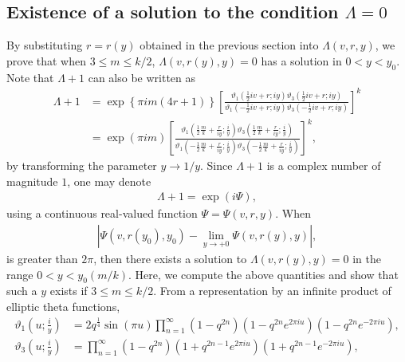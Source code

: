 \documentclass[10pt,leqno]{amsart}
\numberwithin{equation}{section}
\begin{document}
\subsection{Existence of a solution to the condition
\texorpdfstring{$\Lambda=0$}{of Lambda}
}\label{subsection:Existence of a solution to closure condition}
By substituting $r=r(y)$ obtained in the previous section into $\Lambda(v, r, y)$, we prove that when $3\leq m\leq k/2$, $\Lambda(v, r(y), y)=0$ has a solution in $0<y<y_0$.
Note that $\Lambda + 1$ can also be written as 
\begin{equation}\label{Lambdarewrite}
\begin{split}
\Lambda+1&=\exp\left\{\pi im\left(4r+1\right)\right\}\left[\frac{\vartheta_1\left(\frac{1}{2}iv+r;iy\right)\vartheta_3\left(\frac{1}{2}iv+r;iy\right)}{\vartheta_1\left(-\frac{1}{2}iv+r;iy\right)\vartheta_3\left(-\frac{1}{2}iv+r;iy\right)}\right]^k\\
&=\exp{\left(\pi i m\right)}\left[\frac{\vartheta_1\left(\frac{1}{2}\frac{m}{k}+\frac{r}{iy};\frac{i}{y}\right)\vartheta_3\left(\frac{1}{2}\frac{m}{k}+\frac{r}{iy};\frac{i}{y}\right)}{\vartheta_1\left(-\frac{1}{2}\frac{m}{k}+\frac{r}{iy};\frac{i}{y}\right)\vartheta_3\left(-\frac{1}{2}\frac{m}{k}+\frac{r}{iy};\frac{i}{y}\right)}\right]^k,
 \end{split}
\end{equation}
by transforming the parameter $y\rightarrow1/y$.
Since $\Lambda+1$ is a complex number of magnitude $1$, one may denote
\begin{align}
    \Lambda+1=\exp{\left(i\Psi\right)},
\end{align}
using a continuous real-valued function $\Psi=\Psi(v, r, y)$.
When
\begin{align}
    \left |\Psi(v, r(y_0), y_0)-\lim_{y\to +0}\Psi(v, r(y), y)\right |,
\end{align}
is greater than $2\pi$, then there exists a solution to $\Lambda(v, r(y), y)=0$ in the range $0<y< y_0(m/k)$.
Here, we compute the above quantities and show that such a $y$ exists if $3\leq m\leq k/2$.
From a representation by an infinite product of elliptic theta functions,
\begin{align}
   \vartheta_1 \left(u; \frac{i}{y}\right)
&= 2q^{\frac{1}{4}}\sin (\pi u)\prod_{n=1}^\infty \left(1-q^{2n}\right)\left(1-q^{2n}e^{2\pi i u}\right)\left(1-q^{2n}e^{-2\pi i u}\right),\\
\vartheta_3 \left(u; \frac{i}{y}\right)
&= \prod_{n=1}^\infty \left(1-q^{2n}\right)\left(1+q^{2n-1}e^{2\pi i u}\right)\left(1+q^{2n-1}e^{-2\pi i u}\right), \nonumber
\end{align}
\end{document}
